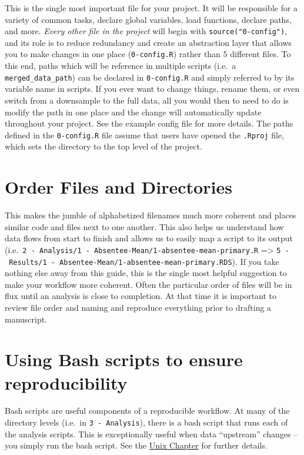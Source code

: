 \documentclass[
]{book}
\begin{document}
This is the single most important file for your project. It will be responsible for a variety of common tasks, declare global variables, load functions, declare paths, and more. \emph{Every other file in the project} will begin with \texttt{source("0-config")}, and its role is to reduce redundancy and create an abstraction layer that allows you to make changes in one place (\texttt{0-config.R}) rather than 5 different files. To this end, paths which will be reference in multiple scripts (i.e.~a \texttt{merged\_data\_path}) can be declared in \texttt{0-config.R} and simply referred to by its variable name in scripts. If you ever want to change things, rename them, or even switch from a downsample to the full data, all you would then to need to do is modify the path in one place and the change will automatically update throughout your project. See the example config file for more details. The paths defined in the \texttt{0-config.R} file assume that users have opened the \texttt{.Rproj} file, which sets the directory to the top level of the project.

\hypertarget{order-files-and-directories}{%
\section{Order Files and Directories}\label{order-files-and-directories}}

This makes the jumble of alphabetized filenames much more coherent and places similar code and files next to one another. This also helps us understand how data flows from start to finish and allows us to easily map a script to its output (i.e.~\texttt{2\ -\ Analysis/1\ -\ Absentee-Mean/1-absentee-mean-primary.R} =\textgreater{} \texttt{5\ -\ Results/1\ -\ Absentee-Mean/1-absentee-mean-primary.RDS}). If you take nothing else away from this guide, this is the single most helpful suggestion to make your workflow more coherent. Often the particular order of files will be in flux until an analysis is close to completion. At that time it is important to review file order and naming and reproduce everything prior to drafting a manuscript.

\hypertarget{using-bash-scripts-to-ensure-reproducibility}{%
\section{Using Bash scripts to ensure reproducibility}\label{using-bash-scripts-to-ensure-reproducibility}}

Bash scripts are useful components of a reproducible workflow. At many of the directory levels (i.e.~in \texttt{3\ -\ Analysis}), there is a bash script that runs each of the analysis scripts. This is exceptionally useful when data ``upstream'' changes -- you simply run the bash script. See the \protect\hyperlink{unix}{Unix Chapter} for further details.
\end{document}
